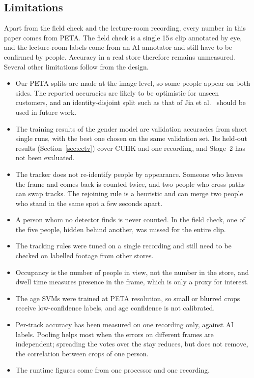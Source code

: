 \documentclass[conference]{IEEEtran}
\begin{document}
\subsection{Limitations}
\label{sec:limits}
Apart from the field check and the lecture-room recording, every number in this
paper comes from PETA. The field check is a single 15\,s clip annotated by eye,
and the lecture-room labels come from an AI annotator and still have to be
confirmed by people. Accuracy in a real store therefore remains unmeasured.
Several other limitations follow from the design.
\begin{itemize}
  \item Our PETA splits are made at the image level, so some people appear on
        both sides. The reported accuracies are likely to be optimistic for
        unseen customers, and an identity-disjoint split such as that of Jia et
        al.~\cite{jia2021rethinking} should be used in future work.
  \item The training results of the gender model are validation accuracies from
        short single runs, with the best one chosen on the same validation set.
        Its held-out results (Section~\ref{sec:cctv}) cover CUHK and one
        recording, and Stage~2 has not been evaluated.
  \item The tracker does not re-identify people by appearance. Someone who leaves
        the frame and comes back is counted twice, and two people who cross paths
        can swap tracks. The rejoining rule is a heuristic and can merge two people
        who stand in the same spot a few seconds apart.
  \item A person whom no detector finds is never counted. In the field check, one
        of the five people, hidden behind another, was missed for the entire clip.
  \item The tracking rules were tuned on a single recording and still need to be
        checked on labelled footage from other stores.
  \item Occupancy is the number of people in view, not the number in the store,
        and dwell time measures presence in the frame, which is only a proxy for
        interest.
  \item The age SVMs were trained at PETA resolution, so small or blurred crops
        receive low-confidence labels, and age confidence is not calibrated.
  \item Per-track accuracy has been measured on one recording only, against AI
        labels. Pooling helps most when the errors on different frames are
        independent; spreading the votes over the stay reduces, but does not
        remove, the correlation between crops of one person.
  \item The runtime figures come from one processor and one recording.
\end{itemize}
\end{document}
